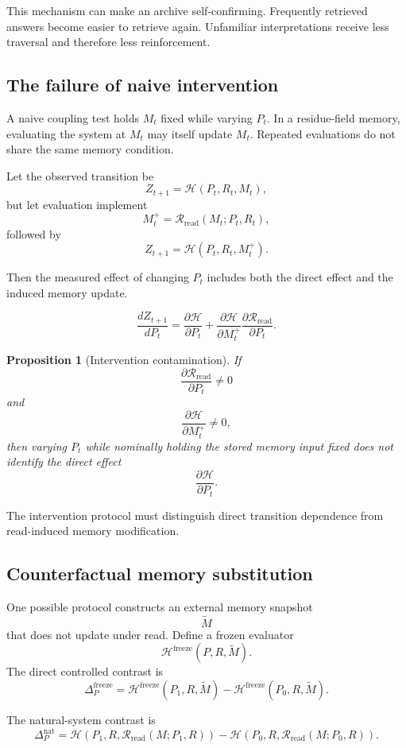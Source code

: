 \documentclass[11pt]{article}
\newtheorem{proposition}[definition]{Proposition}
\theoremstyle{definition}
\newcommand{\Hh}{\mathcal{H}}
\begin{document}
This mechanism can make an archive self-confirming. Frequently retrieved answers become easier to retrieve again. Unfamiliar interpretations receive less traversal and therefore less reinforcement.

\subsection{The failure of naive intervention}

A naive coupling test holds \(M_t\) fixed while varying \(P_t\). In a residue-field memory, evaluating the system at \(M_t\) may itself update \(M_t\). Repeated evaluations do not share the same memory condition.

Let the observed transition be
\[
Z_{t+1}
=
\Hh(P_t,R_t,M_t),
\]
but let evaluation implement
\[
M_t^{+}
=
\mathcal R_{\mathrm{read}}(M_t;P_t,R_t),
\]
followed by
\[
Z_{t+1}
=
\Hh(P_t,R_t,M_t^{+}).
\]

Then the measured effect of changing \(P_t\) includes both the direct effect and the induced memory update.

\[
\frac{dZ_{t+1}}{dP_t}
=
\frac{\partial\Hh}{\partial P_t}
+
\frac{\partial\Hh}{\partial M_t^{+}}
\frac{\partial\mathcal R_{\mathrm{read}}}{\partial P_t}.
\]

\begin{proposition}[Intervention contamination]
If
\[
\frac{\partial\mathcal R_{\mathrm{read}}}{\partial P_t}\neq0
\]
and
\[
\frac{\partial\Hh}{\partial M_t^{+}}\neq0,
\]
then varying \(P_t\) while nominally holding the stored memory input fixed does not identify the direct effect
\[
\frac{\partial\Hh}{\partial P_t}.
\]
\end{proposition}

The intervention protocol must distinguish direct transition dependence from read-induced memory modification.

\subsection{Counterfactual memory substitution}

One possible protocol constructs an external memory snapshot
\[
\widetilde M
\]
that does not update under read. Define a frozen evaluator
\[
\Hh^{\mathrm{freeze}}(P,R,\widetilde M).
\]
The direct controlled contrast is
\[
\Delta_P^{\mathrm{freeze}}
=
\Hh^{\mathrm{freeze}}(P_1,R,\widetilde M)
-
\Hh^{\mathrm{freeze}}(P_0,R,\widetilde M).
\]

The natural-system contrast is
\[
\Delta_P^{\mathrm{nat}}
=
\Hh
\left(
P_1,R,
\mathcal R_{\mathrm{read}}(M;P_1,R)
\right)
-
\Hh
\left(
P_0,R,
\mathcal R_{\mathrm{read}}(M;P_0,R)
\right).
\]
\end{document}
